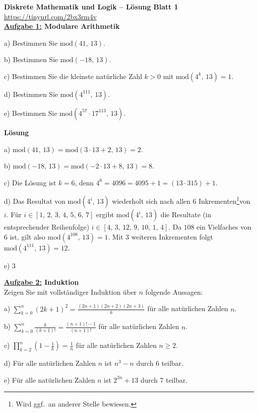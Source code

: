 \documentclass[]{article}
\begin{document}
{\Large\bf Diskrete Mathematik und Logik -- Lösung Blatt 1}\\%
\url{https://tinyurl.com/2bx3rm4v}\\[+0.5cm]
{\bf\underline{Aufgabe 1:} Modulare Arithmetik}\\[-0.8cm]
\begin{list}{}{}
\item[a)]
Bestimmen Sie $\text{mod}(41,\,13)$.
\item[b)]
Bestimmen Sie $\text{mod}(-18,\,13)$.
\item[c)]
Bestimmen Sie die kleinste natürliche Zahl $k>0$ mit $\text{mod}(4^k,\,13)=1$.
\item[d)]
Bestimmen Sie $\text{mod}(4^{111},\,13)$.
\item[e)]
Bestimmen Sie $\text{mod}(4^{57}\cdot17^{113},\,13)$.
\end{list}
{\bf Lösung}\\[-0.8cm]
\begin{list}{}{}
\item[a)]
$\text{mod}(41,\,13)=\text{mod}(3\cdot13+2,\,13)=2$.
\item[b)]
$\text{mod}(-18,\,13)=\text{mod}(-2\cdot13+8,\,13)=8$.
\item[c)]
Die Lösung ist $k=6$, denn $4^6=4096=4095+1=(13\cdot315)+1$.
\item[d)]
Das Resultat von $\text{mod}(4^i,\,13)$ wiederholt sich nach allen 6 Inkrementen\footnote{Wird ggf.~an anderer Stelle bewiesen.}von $i$. Für $i\in[1,\,2,\,3,\,4,\,5,\,6,\,7]$ ergibt $\text{mod}(4^i,\,13)$ die Resultate (in entsprechender Reihenfolge) $i\in[4,\,3,\,12,\,9,\,10,\,1,\,4]$. Da $108$ ein Vielfaches von $6$ ist, gilt also $\text{mod}(4^{108},\,13)=1$. Mit 3 weiteren Inkrementen folgt $\text{mod}(4^{111},\,13)=12$.
\item[e)]
3
\end{list}
{\bf\underline{Aufgabe 2:} Induktion}\\[+0.3cm]
Zeigen Sie mit vollständiger Induktion über $n$ folgende Aussagen:\\[-0.8cm]
\begin{list}{}{}
\item[a)]
$\sum_{k=0}^n(2k{+}1)^2=\frac{(2n+1)(2n+2)(2n+3)}{6}$ für alle natürlichen Zahlen $n$.
\item[b)]
$\sum_{k=0}^n\frac{k}{(k+1)!}=\frac{(n+1)!-1}{(n+1)!}$ für alle natürlichen Zahlen $n$.
\item[c)]
$\prod_{k=2}^n\left(1-\frac{1}{k}\right)=\frac{1}{n}$ für alle natürlichen Zahlen $n\geq2$.
\item[d)]
Für alle natürlichen Zahlen $n$ ist $n^3-n$ durch 6 teilbar.
\item[e)]
Für alle natürlichen Zahlen $n$ ist $2^{3n}+13$ durch 7 teilbar.
\end{list}
\end{document}
